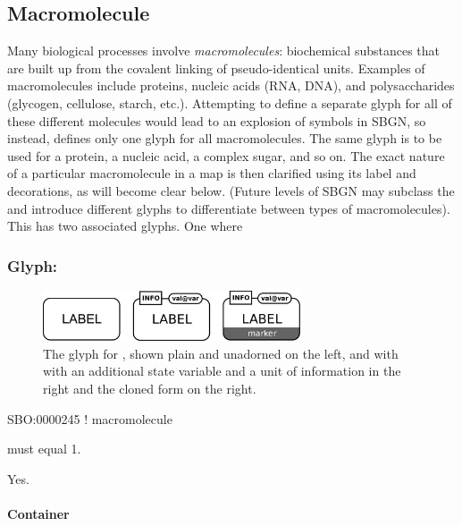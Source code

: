\subsection{Macromolecule}
\label{sec:macromolecule}

Many biological processes involve \emph{macromolecules}: biochemical
substances that are built up from the covalent linking of
pseudo-identical units.  Examples of macromolecules include proteins,
nucleic acids (RNA, DNA), and polysaccharides (glycogen, cellulose,
starch, etc.).  Attempting to define a separate glyph for all of these
different molecules would lead to an explosion of symbols in SBGN, so
instead, \SBGNPDLone defines only one glyph for all macromolecules.
The same glyph is to be used for a protein, a nucleic acid, a complex
sugar, and so on.  The exact nature of a particular macromolecule in a
map is then clarified using its label and decorations, as will become
clear below.  (Future levels of SBGN may subclass the
 and introduce different glyphs to differentiate
between types of macromolecules). This has two associated glyphs. One
where 

\subsubsection{Glyph: }

\begin{figure}[H]
  \centering
  \includegraphics[width = 3in]{images/macromolecule}
  \caption{The \PD glyph for , shown plain and
    unadorned on the left, and with with an additional state variable and a
    unit of information in the right and the cloned form on the right.}
  \label{fig:macromolecule}
\end{figure}


 \begin{glyphDescription}
\glyphSboTerm SBO:0000245 ! macromolecule 
\glyphAux 
\glyphRules%
\begin{inparaenum}
\item {} must equal 1.
\end{inparaenum}
\glyphCloning Yes.
\end{glyphDescription}

\paragraph{Container}

